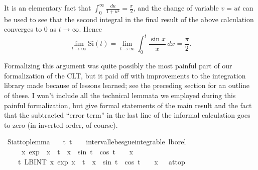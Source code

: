 \documentclass[leqno]{article}
\theoremstyle{definition}
\newcommand\Si{\text{Si}}
\begin{document}
It is an elementary fact that $\int_0^\infty \frac{du}{1+u^2} = \frac{\pi}{2}$, and the change of variable $v = ut$ can be used to see that the second integral in the final result of the above calculation converges to $0$ as $t \rightarrow \infty$. Hence
\[ \lim_{t \rightarrow \infty} \Si(t) = \lim_{t \rightarrow \infty} \int_0^t \frac{\sin x}{x} \, dx = \frac{\pi}{2}. \]

Formalizing this argument was quite possibly the most painful part of our formalization of the CLT, but it paid off with improvements to the integration library made because of lessons learned; see the preceding section for an outline of these. I won't include all the technical lemmata we employed during this painful formalization, but give formal statements of the main result and the fact that the subtracted ``error term'' in the last line of the informal calculation goes to zero (in inverted order, of course).

\medskip

\begin{isabellebody}
\isamarkupfalse%
\ Si{\isacharunderscore}at{\isacharunderscore}top{\isacharunderscore}lemma{\isacharcolon}\isanewline
\ \ \ {\isachardoublequoteopen}{\isasymAnd}t{\isachardot}\ t\ {\isasymge}\ {}\ {\isasymLongrightarrow}\ interval{\isacharunderscore}lebesgue{\isacharunderscore}integrable\ lborel\ {}\ {\isasyminfinity}\isanewline
\ \ \ \ \ {\isacharparenleft}{\isasymlambda}x{\isachardot}\ exp\ {\isacharparenleft}{\isacharminus}\ {\isacharparenleft}x\ {\isacharasterisk}\ t{\isacharparenright}{\isacharparenright}\ {\isacharasterisk}\ {\isacharparenleft}x\ {\isacharasterisk}\ sin\ t\ {\isacharplus}\ cos\ t{\isacharparenright}\ {\isacharslash}\ {\isacharparenleft}{}\ {\isacharplus}\ x\isanewline
\ \ \isanewline
\ \ \ \ {\isachardoublequoteopen}{\isacharparenleft}{\isacharparenleft}{\isasymlambda}t{\isachardot}\ {\isacharparenleft}LBINT\ x{\isacharequal}{}{\isachardot}{\isachardot}{\isasyminfinity}{\isachardot}\ exp\ {\isacharparenleft}{\isacharminus}{\isacharparenleft}x\ {\isacharasterisk}\ t{\isacharparenright}{\isacharparenright}\ {\isacharasterisk}\ {\isacharparenleft}x\ {\isacharasterisk}\ sin\ t\ {\isacharplus}\ cos\ t{\isacharparenright}\ {\isacharslash}\ {\isacharparenleft}{}\ {\isacharplus}\ x{\isacharcircum}{}{\isacharparenright}{\isacharparenright}{\isacharparenright}\ {\isacharminus}{\isacharminus}{\isacharminus}{\isachargreater}\ {}{\isacharparenright}\ at{\isacharunderscore}top{\isachardoublequoteclose}
\end{isabellebody}
\end{document}
